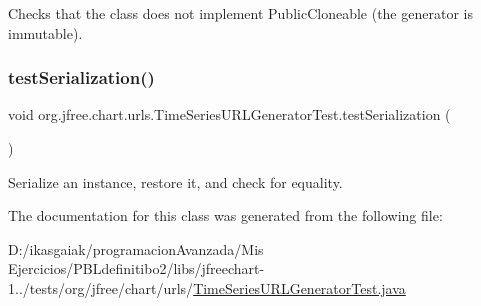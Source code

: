 Checks that the class does not implement Public\+Cloneable (the generator is immutable). \mbox{\label{classorg_1_1jfree_1_1chart_1_1urls_1_1_time_series_u_r_l_generator_test_ad87a9fdc4ad8115eb15d2e41827b1ccb}} 
\subsubsection{\texorpdfstring{test\+Serialization()}{testSerialization()}}
{\footnotesize\ttfamily void org.\+jfree.\+chart.\+urls.\+Time\+Series\+U\+R\+L\+Generator\+Test.\+test\+Serialization (\begin{DoxyParamCaption}{ }\end{DoxyParamCaption})}

Serialize an instance, restore it, and check for equality. 

The documentation for this class was generated from the following file\+:\begin{DoxyCompactItemize}
\item 
D\+:/ikasgaiak/programacion\+Avanzada/\+Mis Ejercicios/\+P\+B\+Ldefinitibo2/libs/jfreechart-\/1../tests/org/jfree/chart/urls/\mbox{\hyperlink{_time_series_u_r_l_generator_test_8java}{Time\+Series\+U\+R\+L\+Generator\+Test.\+java}}\end{DoxyCompactItemize}
